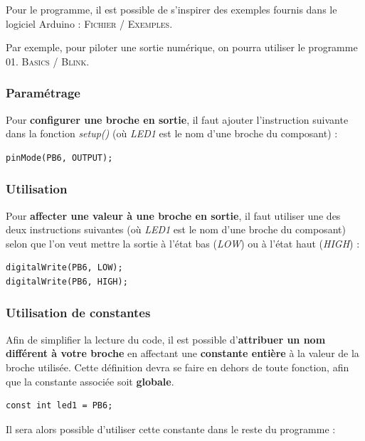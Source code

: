 \documentclass[a4paper,11pt,titlepage]{article} %
\begin{document}
Pour le programme, il est possible de s'inspirer des exemples fournis dans le logiciel Arduino : \textsc{Fichier / Exemples}.

Par exemple, pour piloter une sortie numérique, on pourra utiliser le programme \textsc{01. Basics / Blink}.

\subsubsection{Paramétrage}

Pour \textbf{configurer une broche en sortie}, il faut ajouter l'instruction suivante dans la fonction \textsl{setup()} (où \textsl{LED1} est le nom d'une broche du composant) :

\begin{lstlisting}
pinMode(PB6, OUTPUT);
\end{lstlisting}

\subsubsection{Utilisation}

Pour \textbf{affecter une valeur à une broche en sortie}, il faut utiliser une des deux instructions suivantes (où \textsl{LED1} est le nom d'une broche du composant) selon que l'on veut mettre la sortie à l'état bas (\textit{LOW}) ou à l'état haut (\textit{HIGH}) :

\begin{lstlisting}
digitalWrite(PB6, LOW);
digitalWrite(PB6, HIGH);
\end{lstlisting}


\subsubsection{Utilisation de constantes}

Afin de simplifier la lecture du code, il est possible d'\textbf{attribuer un nom différent à votre broche} en affectant une \textbf{constante entière} à la valeur de la broche utilisée. Cette définition devra se faire en dehors de toute fonction, afin que la constante associée soit \textbf{globale}.

\begin{lstlisting}
const int led1 = PB6;
\end{lstlisting}

\medskip

Il sera alors possible d'utiliser cette constante dans le reste du programme :
\end{document}
